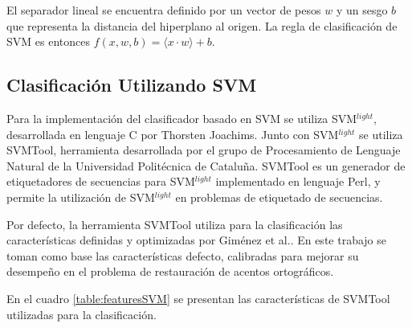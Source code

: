 \documentclass[runningheads,a4paper]{llncs}
\begin{document}
El separador lineal se encuentra definido por un vector de pesos $w$ y un sesgo $b$ que representa la distancia del hiperplano al origen. La regla de clasificación de SVM es entonces $f(x,w,b)=\langle x \cdot w \rangle+b$. %



\subsection{Clasificación Utilizando SVM}
Para la implementaci\'on del clasificador basado en SVM se utiliza SVM$^{light}$, desarrollada en lenguaje C por Thorsten Joachims\cite{JOACHIMS08}. Junto con SVM$^{light}$ se utiliza SVMTool, herramienta desarrollada por el grupo de Procesamiento de Lenguaje Natural de la Universidad Politécnica de Cataluña\cite{GIMENEZ04}\cite{GIMENEZ06}. SVMTool es un generador de etiquetadores de secuencias para SVM$^{light}$ implementado en lenguaje Perl, y permite  la utilizaci\'on de SVM$^{light}$ en problemas de etiquetado de secuencias. 

Por defecto, la herramienta SVMTool utiliza para la clasificación las características definidas y optimizadas por Giménez et al.\cite{GIMENEZ04}. En este trabajo se toman como base las caracter\'isticas defecto, calibradas para mejorar su desempeño en el problema de restauración de acentos ortográficos.

En el cuadro \ref{table:featuresSVM} se presentan las características de SVMTool utilizadas para la clasificación.
\end{document}

